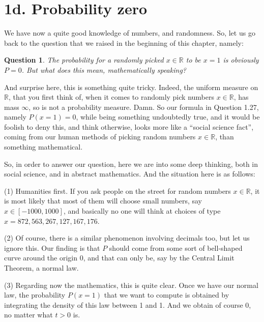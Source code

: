 \documentclass[12pt]{amsbook}
\newtheorem{question}[theorem]{Question}
\begin{document}
\section*{1d. Probability zero}

We have now a quite good knowledge of numbers, and randomness. So, let us go back to the question that we raised in the beginning of this chapter, namely:


\begin{question}
The probability for a randomly picked $x\in\mathbb R$ to be $x=1$ is obviously $P=0$. But what does this mean, mathematically speaking?
\end{question} 

And surprise here, this is something quite tricky. Indeed, the uniform measure on $\mathbb R$, that you first think of, when it comes to randomly pick numbers $x\in\mathbb R$, has mass $\infty$, so is not a probability measure. Damn. So our formula in Question 1.27, namely $P(x=1)=0$, while being something undoubtedly true, and it would be foolish to deny this, and think otherwise, looks more like a ``social science fact'', coming from our human methods of picking random numbers $x\in\mathbb R$, than something mathematical.

\bigskip

So, in order to answer our question, here we are into some deep thinking, both in social science, and in abstract mathematics. And the situation here is as follows:

\bigskip

(1) Humanities first. If you ask people on the street for random numbers $x\in\mathbb R$, it is most likely that most of them will choose small numbers, say $x\in[-1000,1000]$, and basically no one will think at choices of type $x=872,563,267,127,167,176$.

\bigskip

(2) Of course, there is a similar phenomenon involving decimals too, but let us ignore this. Our finding is that $P$ should come from some sort of bell-shaped curve around the origin 0, and that can only be, say by the Central Limit Theorem, a normal law.

\bigskip

(3) Regarding now the mathematics, this is quite clear. Once we have our normal law, the probability $P(x=1)$ that we want to compute is obtained by integrating the density of this law between 1 and 1. And we obtain of course 0, no matter what $t>0$ is.
\end{document}
